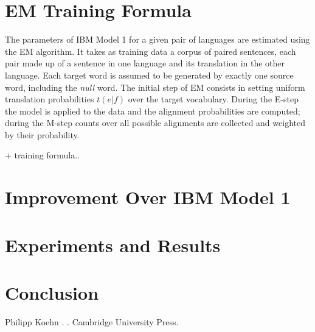 \documentclass[11pt]{article}
\begin{document}

\section{EM Training Formula}
\label{EM}
The parameters of IBM Model 1 for a given pair of languages are estimated using the EM algorithm. It takes as training data a corpus of paired sentences, each pair made up of a sentence in one language and its translation in the other language. Each target word is assumed to be generated by exactly one source word, including the \textit{null} word. The initial step of EM consists in setting uniform translation probabilities $t(e|f)$ over the target vocabulary. During the E-step the model is applied to the data and the alignment probabilities are computed; during the M-step counts over all possible alignments are collected and weighted by their probability. 

+ training formula..

\section{Improvement Over IBM Model 1}
\label{Improvement}

\section{Experiments and Results}
\label{Eval}

\section{Conclusion}
\label{Concl}

\begin{thebibliography}{}
\bibitem[1]{}
Philipp Koehn
.
.
\newblock Cambridge University Press.

\end{thebibliography}
\end{document}
